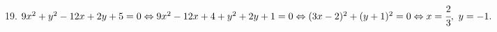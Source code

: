 19. $9x^2+y^2-12x+2y+5=0\Leftrightarrow9x^2-12x+4+y^2+2y+1=0\Leftrightarrow(3x-2)^2+(y+1)^2=0\Leftrightarrow x=\cfrac{2}{3},\ y=-1.$\\
